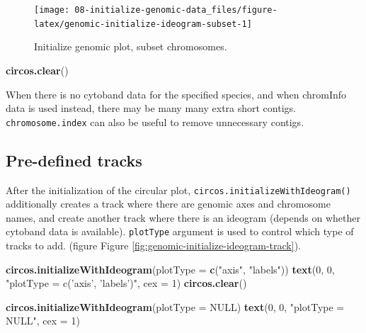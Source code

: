 \documentclass[]{book}
\newenvironment{Shaded}{\begin{snugshade}}{\end{snugshade}}
\newcommand{\KeywordTok}[1]{\textcolor[rgb]{0.13,0.29,0.53}{\textbf{#1}}}
\newcommand{\DataTypeTok}[1]{\textcolor[rgb]{0.13,0.29,0.53}{#1}}
\newcommand{\DecValTok}[1]{\textcolor[rgb]{0.00,0.00,0.81}{#1}}
\newcommand{\StringTok}[1]{\textcolor[rgb]{0.31,0.60,0.02}{#1}}
\newcommand{\OtherTok}[1]{\textcolor[rgb]{0.56,0.35,0.01}{#1}}
\newcommand{\NormalTok}[1]{#1}
\begin{document}
\begin{figure}

{\centering \texttt{[image: 08-initialize-genomic-data\_files/figure-latex/genomic-initialize-ideogram-subset-1]} 

}

\caption{Initialize genomic plot, subset chromosomes.}\label{fig:genomic-initialize-ideogram-subset}
\end{figure}

\begin{Shaded}
\begin{Highlighting}[]
\KeywordTok{circos.clear}\NormalTok{()}
\end{Highlighting}
\end{Shaded}

When there is no cytoband data for the specified species, and when
chromInfo data is used instead, there may be many many extra short
contigs. \texttt{chromosome.index} can also be useful to remove
unnecessary contigs.

\subsection{Pre-defined tracks}\label{pre-defined-tracks}

After the initialization of the circular plot,
\texttt{circos.initializeWithIdeogram()} additionally creates a track
where there are genomic axes and chromosome names, and create another
track where there is an ideogram (depends on whether cytoband data is
available). \texttt{plotType} argument is used to control which type of
tracks to add. (figure Figure
\ref{fig:genomic-initialize-ideogram-track}).

\begin{Shaded}
\begin{Highlighting}[]
\KeywordTok{circos.initializeWithIdeogram}\NormalTok{(}\DataTypeTok{plotType =} \KeywordTok{c}\NormalTok{(}\StringTok{"axis"}\NormalTok{, }\StringTok{"labels"}\NormalTok{))}
\KeywordTok{text}\NormalTok{(}\DecValTok{0}\NormalTok{, }\DecValTok{0}\NormalTok{, }\StringTok{"plotType = c('axis', 'labels')"}\NormalTok{, }\DataTypeTok{cex =} \DecValTok{1}\NormalTok{)}
\KeywordTok{circos.clear}\NormalTok{()}

\KeywordTok{circos.initializeWithIdeogram}\NormalTok{(}\DataTypeTok{plotType =} \OtherTok{NULL}\NormalTok{)}
\KeywordTok{text}\NormalTok{(}\DecValTok{0}\NormalTok{, }\DecValTok{0}\NormalTok{, }\StringTok{"plotType = NULL"}\NormalTok{, }\DataTypeTok{cex =} \DecValTok{1}\NormalTok{)}
\end{Highlighting}
\end{Shaded}
\end{document}
